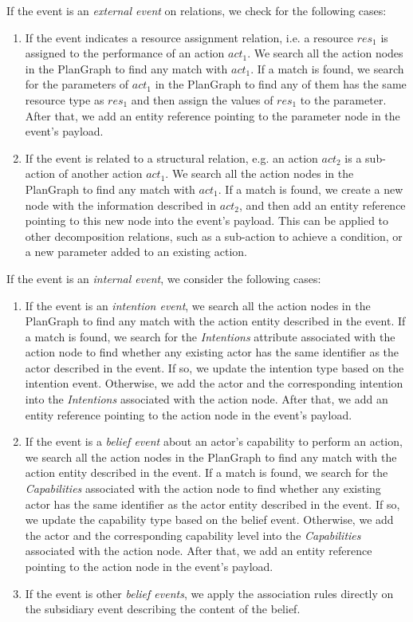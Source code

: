 If the event is an \emph{external event} on relations, we check for the following cases:
\begin{enumerate}
	\item If the event indicates a resource assignment relation, i.e. a resource $res_1$ is assigned to the performance of an action $act_1$. We search all the action nodes in the PlanGraph to find any match with $act_1$. If a match is found, we search for the parameters of $act_1$ in the PlanGraph to find any of them has the same resource type as $res_1$ and then assign the values of $res_1$ to the parameter. After that, we add an entity reference pointing to the parameter node in the event's payload. 
	\item If the event is related to a structural relation, e.g. an action $act_2$ is a sub-action of another action $act_1$. We search all the action nodes in the PlanGraph to find any match with $act_1$. If a match is found, we create a new node with the information described in $act_2$, and then add an entity reference pointing to this new node into the event's payload. This can be applied to other decomposition relations, such as a sub-action to achieve a condition, or a new parameter added to an existing action.
\end{enumerate}

If the event is an \emph{internal event}, we consider the following cases:
\begin{enumerate}
	\item If the event is an \emph{intention event}, we search all the action nodes in the PlanGraph to find any match with the action entity described in the event. If a match is found, we search for the \emph{Intentions} attribute associated with the action node to find whether any existing actor has the same identifier as the actor described in the event. If so, we update the intention type based on the intention event. Otherwise, we add the actor and the corresponding intention into the \emph{Intentions} associated with the action node. After that, we add an entity reference pointing to the action node in the event's payload. 
	\item If the event is a \emph{belief event} about an actor's capability to perform an action, we search all the action nodes in the PlanGraph to find any match with the action entity described in the event. If a match is found, we search for the \emph{Capabilities} associated with the action node to find whether any existing actor has the same identifier as the actor entity described in the event. If so, we update the capability type based on the belief event. Otherwise, we add the actor and the corresponding capability level into the \emph{Capabilities} associated with the action node. After that, we add an entity reference pointing to the action node in the event's payload. 
	\item If the event is other \emph{belief events}, we apply the association rules directly on the subsidiary event describing the content of the belief. 
\end{enumerate}

